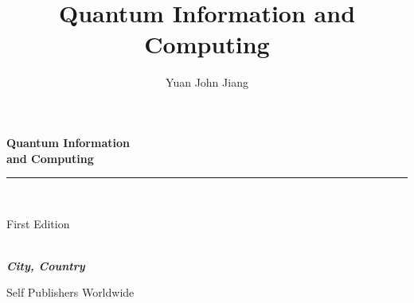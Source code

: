 \documentclass{book}
\title{Quantum Information and Computing}
\author{Yuan John Jiang}
\makeatletter
\newcommand{\booksubtitle}{A Textbook for Computer Science and Engineering Students}
\newcommand{\authorsubtitle}{City, Country}
\newcommand{\bookauthor}{\@author}
\makeatother
\begin{document}
\frontmatter



\begin{titlepage}
\begin{flushleft}

\textbf{\fontsize{38}{50}\selectfont Quantum Information\\and Computing\\}

\par\noindent\rule{\textwidth}{4pt}\\


\begin{flushright}
\Large First Edition
\end{flushright}

\vspace{\fill}

\textbf{\large \bookauthor}\\[3.5pt]
\textbf{\large \textit{\authorsubtitle}}

\vspace{\fill}

\begin{center}
\small{Self Publishers Worldwide\\
}
\end{center}

\end{flushleft}
\end{titlepage}
\restoregeometry

\thispagestyle{empty}
\end{document}

